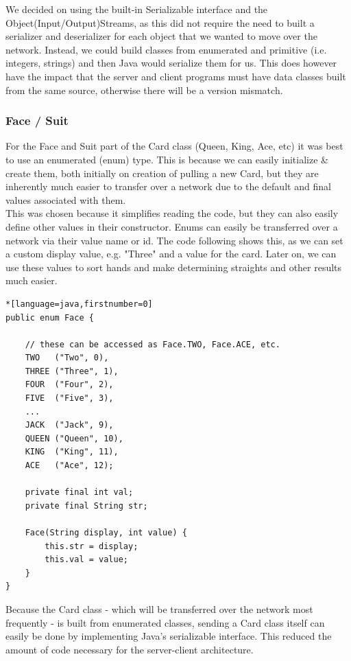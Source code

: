 \documentclass[11pt]{article}
\begin{document}
We decided on using the built-in Serializable interface and the Object(Input/Output)Streams, as this did not require the need to built a serializer and deserializer for each object that we wanted to move over the network. Instead, we could build classes from enumerated and primitive (i.e. integers, strings) and then Java would serialize them for us. This does however have the impact that the server and client programs must have data classes built from the same source, otherwise there will be a version mismatch.


\subsubsection{Face / Suit}
For the Face and Suit part of the Card class (Queen, King, Ace, etc) it was best to use an enumerated (enum) type. This is because we can easily initialize \& create them, both initially on creation of pulling a new Card, but they are inherently much easier to transfer over a network due to the default and final values associated with them. \\

This was chosen because it simplifies reading the code, but they can also easily define other values in their constructor. Enums can easily be transferred over a network via their value name or id. The code following shows this, as we can set a custom display value, e.g. "Three" and a value for the card. Later on, we can use these values to sort hands and make determining straights and other results much easier. 

\begin{lstlisting}*[language=java,firstnumber=0]
public enum Face {

	// these can be accessed as Face.TWO, Face.ACE, etc. 
    TWO   ("Two", 0),
    THREE ("Three", 1),
    FOUR  ("Four", 2),
    FIVE  ("Five", 3),
	...
    JACK  ("Jack", 9),
    QUEEN ("Queen", 10),
    KING  ("King", 11),
    ACE   ("Ace", 12);

    private final int val;
    private final String str;

    Face(String display, int value) {
        this.str = display;
        this.val = value;
    }
}
\end{lstlisting}


Because the Card class - which will be transferred over the network most frequently - is built from enumerated classes, sending a Card class itself can easily be done by implementing Java's serializable interface. This reduced the amount of code necessary for the server-client architecture.
\end{document}
